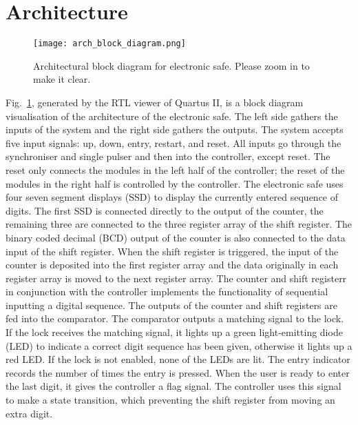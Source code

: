 \section{Architecture}

\begin{figure}[htbp]
   \centering
   \texttt{[image: arch\_block\_diagram.png]}
   \caption{Architectural block diagram for electronic safe. Please zoom in to make it clear.}
   \label{fig:arch_block_diagram}
\end{figure}

Fig.~\ref{fig:arch_block_diagram}, generated by the RTL viewer of Quartus II, is a block diagram visualisation of the architecture of the electronic safe. The left side gathers the inputs of the system and the right side gathers the outputs. The system accepts five input signals: up, down, entry, restart, and reset. All inputs go through the synchroniser and single pulser and then into the controller, except reset. The reset only connects the modules in the left half of the controller; the reset of the modules in the right half is controlled by the controller. The electronic safe uses four seven segment displays (SSD) to display the currently entered sequence of digits. The first SSD is connected directly to the output of the counter, the remaining three are connected to the three register array of the shift register. The binary coded decimal (BCD) output of the counter is also connected to the data input of the shift register. When the shift register is triggered, the input of the counter is deposited into the first register array and the data originally in each register array is moved to the next register array. The counter and shift registerr in conjunction with the controller implements the functionality of sequential inputting a digital sequence. The outputs of the counter and shift registers are fed into the comparator. The comparator outputs a matching signal to the lock. If the lock receives the matching signal, it lights up a green light-emitting diode (LED) to indicate a correct digit sequence has been given, otherwise it lights up a red LED. If the lock is not enabled, none of the LEDs are lit. The entry indicator records the number of times the entry is pressed. When the user is ready to enter the last digit, it gives the controller a flag signal. The controller uses this signal to make a state transition, which preventing the shift register from moving an extra digit.
